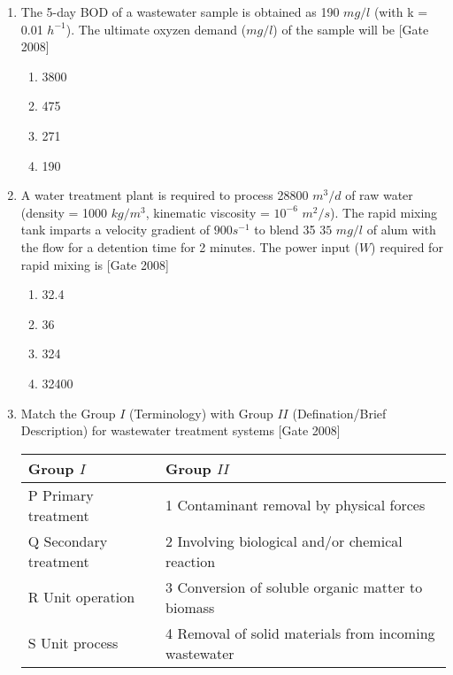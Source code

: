\documentclass[journal]{IEEEtran}
\begin{document}
\begin{enumerate}
\begin{multicols}{2}
\begin{enumerate}
	\end{enumerate}
\end{multicols}
	\item The 5-day BOD of a wastewater sample is obtained as 190 $mg/l$ (with k = 0.01 $h^{-1}$). The ultimate oxyzen demand ($mg/l$) of the sample will be \hfill [Gate 2008]
	\begin{multicols}{2}
	\begin{enumerate}
		\item 3800
		\item 475
		\item 271
		\item 190
	\end{enumerate}
\end{multicols}
\item A water treatment plant is required to process 28800 $m^3/d$ of raw water (density = 1000 $kg/m^3$, kinematic viscosity = $10^{-6}$ $m^2/s$). The rapid mixing tank imparts a velocity gradient of $900 s^{-1}$ to blend 35 $35$ $mg/l$ of alum with the flow for a detention time for 2 minutes. The power input ($W$) required for rapid mixing is \hfill [Gate 2008]
\begin{multicols}{2}
	\begin{enumerate}
		\item 32.4
		\item 36
		\item 324
		\item 32400
	\end{enumerate}
\end{multicols}
	\item Match the Group $I$ (Terminology) with Group $II$ (Defination/Brief Description) for wastewater treatment systems \hfill [Gate 2008] \\
\begin{center}

\begin{tabular}{|l|l|}
	\hline 
	Group $I$ & Group $II$\\
	\hline
	P Primary treatment   & 1 Contaminant removal by physical forces \\
	\hline
	Q Secondary treatment & 2 Involving biological and/or chemical reaction\\
	\hline
	R Unit operation & 3 Conversion of soluble organic matter to biomass \\
	\hline
	S Unit process & 4 Removal of solid materials from incoming wastewater\\
	\hline


\end{tabular}
\end{center}
\end{enumerate}
\end{document}
